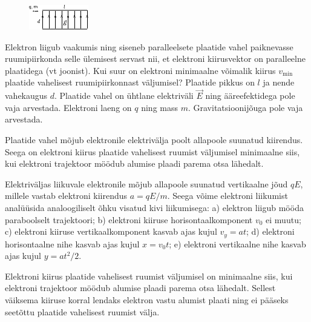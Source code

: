 
\begin{figure}
	\vspace{-10pt}
	\hspace{-10pt}
	\includegraphics[width=\linewidth]{2017-lahg-03-elJoonisMK.pdf}
\end{figure}

Elektron liigub vaakumis ning siseneb paralleelsete plaatide vahel paiknevasse ruumipiirkonda selle ülemisest servast nii, et elektroni kiirusvektor on paralleelne plaatidega (vt joonist). Kui suur on elektroni minimaalne võimalik kiirus $v_\mathrm{min}$ plaatide vahelisest ruumipiirkonnast väljumisel? Plaatide pikkus on $l$ ja nende vahekaugus $d$. Plaatide vahel on ühtlane elektriväli $\vec{E}$ ning ääreefektidega pole vaja arvestada. Elektroni laeng on $q$ ning mass $m$. Gravitatsioonijõuga pole vaja arvestada.

\hint
Plaatide vahel mõjub elektronile elektrivälja poolt allapoole suunatud kiirendus. Seega on elektroni kiirus plaatide vahelisest ruumist väljumisel minimaalne siis, kui elektroni trajektoor möödub alumise plaadi parema otsa lähedalt.

\solu
Elektriväljas liikuvale elektronile mõjub allapoole suunatud vertikaalne jõud $qE$, millele vastab elektroni kiirendus $a=qE/m$. Seega võime elektroni liikumist analüüsida analoogiliselt õhku visatud kivi liikumisega: a) elektron liigub mööda paraboolselt trajektoori; b) elektroni kiiruse horisontaalkomponent $v_0$ ei muutu; c) elektroni kiiruse vertikaalkomponent kasvab ajas kujul $v_y=at$; d) elektroni horisontaalne nihe kasvab ajas kujul $x=v_0t$; e) elektroni vertikaalne nihe kasvab ajas kujul $y=at^2/2$.

Elektroni kiirus plaatide vahelisest ruumist väljumisel on minimaalne siis, kui elektroni trajektoor möödub alumise plaadi parema otsa lähedalt. Sellest väiksema kiiruse korral lendaks elektron vastu alumist plaati ning ei pääseks seetõttu plaatide vahelisest ruumist välja.

